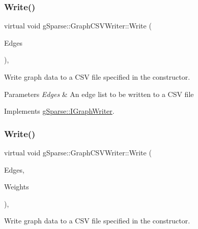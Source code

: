 \subsubsection{\texorpdfstring{Write()}{Write()}\hspace{0.1cm}{\footnotesize\ttfamily [2/3]}}
{\footnotesize\ttfamily virtual void g\+Sparse\+::\+Graph\+C\+S\+V\+Writer\+::\+Write (\begin{DoxyParamCaption}\item[{const g\+Sparse\+::\+Edge\+Matrix \&}]{Edges }\end{DoxyParamCaption})\hspace{0.3cm}{\ttfamily [inline]}, {\ttfamily [virtual]}}



Write graph data to a C\+SV file specified in the constructor. 


\begin{DoxyParams}{Parameters}
{\em Edges} & An edge list to be written to a C\+SV file \\
\hline
\end{DoxyParams}


Implements \mbox{\hyperlink{classg_sparse_1_1_i_graph_writer_aa778df52e1595439d724fc873a8dfb52}{g\+Sparse\+::\+I\+Graph\+Writer}}.

\mbox{\label{classg_sparse_1_1_graph_c_s_v_writer_a66e9fe4e8887abca81d6d0090b217950}} 
\subsubsection{\texorpdfstring{Write()}{Write()}\hspace{0.1cm}{\footnotesize\ttfamily [3/3]}}
{\footnotesize\ttfamily virtual void g\+Sparse\+::\+Graph\+C\+S\+V\+Writer\+::\+Write (\begin{DoxyParamCaption}\item[{const g\+Sparse\+::\+Edge\+Matrix \&}]{Edges,  }\item[{const g\+Sparse\+::\+Precision\+Row\+Matrix \&}]{Weights }\end{DoxyParamCaption})\hspace{0.3cm}{\ttfamily [inline]}, {\ttfamily [virtual]}}



Write graph data to a C\+SV file specified in the constructor. 



